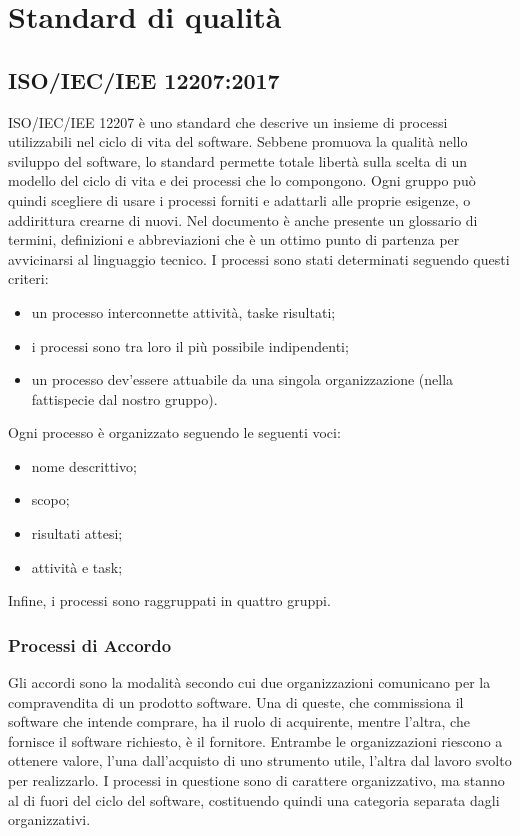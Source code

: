 \appendix
\section{Standard di qualità}
	\subsection{ISO/IEC/IEE 12207:2017}
	ISO/IEC/IEE 12207 è uno standard che descrive un insieme di processi utilizzabili nel ciclo di vita del software. 
	Sebbene promuova la qualità nello sviluppo del software, lo standard permette totale libertà sulla scelta di un modello del ciclo di vita e dei processi che lo compongono. Ogni gruppo può quindi scegliere di usare i processi forniti e adattarli alle proprie esigenze, o addirittura crearne di nuovi.\newline 
	Nel documento è anche presente un glossario di termini, definizioni e abbreviazioni che è un ottimo punto di partenza per avvicinarsi al linguaggio tecnico.\newline 
	I processi sono stati determinati seguendo questi criteri:
	\begin{itemize}
		\item un processo interconnette attività, task\glosp e risultati;
		\item i processi sono tra loro il più possibile indipendenti;
		\item un processo dev'essere attuabile da una singola organizzazione (nella fattispecie dal nostro gruppo).
	\end{itemize}
	Ogni processo è organizzato seguendo le seguenti voci:
	\begin{itemize}
		\item nome descrittivo;
		\item scopo;
		\item risultati attesi;
		\item attività e task;
	\end{itemize}
	Infine, i processi sono raggruppati in quattro gruppi.
		\subsubsection{Processi di Accordo}
		Gli accordi sono la modalità secondo cui due organizzazioni comunicano per la compravendita di un prodotto software. Una di queste, che commissiona il software che intende comprare, ha il ruolo di acquirente, mentre l'altra, che fornisce il software richiesto, è il fornitore. Entrambe le organizzazioni riescono a ottenere valore, l'una dall'acquisto di uno strumento utile, l'altra dal lavoro svolto per realizzarlo.
		I processi in questione sono di carattere organizzativo, ma stanno al di fuori del ciclo del software, costituendo quindi una categoria separata dagli organizzativi.
